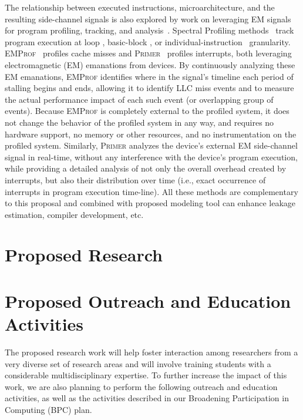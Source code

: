 \documentclass[11 pt]{article}
\begin{document}
The relationship between executed instructions, microarchitecture, and the resulting side-channel signals is also explored by work on leveraging EM signals for program profiling, tracking, and analysis~\cite{7783762,Gorman:2017:AON:3123939.3123973,Elvan2021,Zop, Zop2,Moumita2018,Moumita2022}. Spectral Profiling methods~\cite{7783762,Zop,Zop2,Elvan2021} track program execution at loop \cite{7783762}, basic-block \cite{Zop,Zop2}, or individual-instruction~\cite{Elvan2021} granularity.
\textsc{EMProf}~\cite{Moumita2018} profiles cache misses and \textsc{Primer}~\cite{Moumita2022} profiles interrupts, both leveraging electromagnetic (EM) emanations from devices. By continuously analyzing these EM emanations, \textsc{EMProf} identifies where in the signal's timeline each period of stalling begins and ends, allowing it to identify LLC miss events and to measure the actual performance impact of each such event (or overlapping group of events). Because \textsc{EMProf} is completely external to the profiled system, it does not change the behavior of the profiled system in any way, and requires no hardware support, no memory or other resources, and no instrumentation on the profiled system. Similarly, \textsc{Primer} analyzes the device's external EM side-channel signal in real-time, without any interference with the device's program execution, while providing a detailed analysis of not only the overall overhead created by interrupts, but also their distribution over time (i.e., exact occurrence of interrupts in program execution time-line). All these methods are complementary to this proposal and combined with proposed modeling tool can enhance leakage estimation, compiler development, etc.

\section{Proposed Research}
\label{sec:proposed}



\section{Proposed Outreach and Education Activities}

The proposed research work will help foster interaction among researchers from a
very diverse set of research areas and will involve training students
with a considerable multidisciplinary expertise. To further increase
the impact of this work, we are also planning to perform the following
outreach and education activities, as well as the activities described in our Broadening Participation in Computing (BPC) plan.
\end{document}
